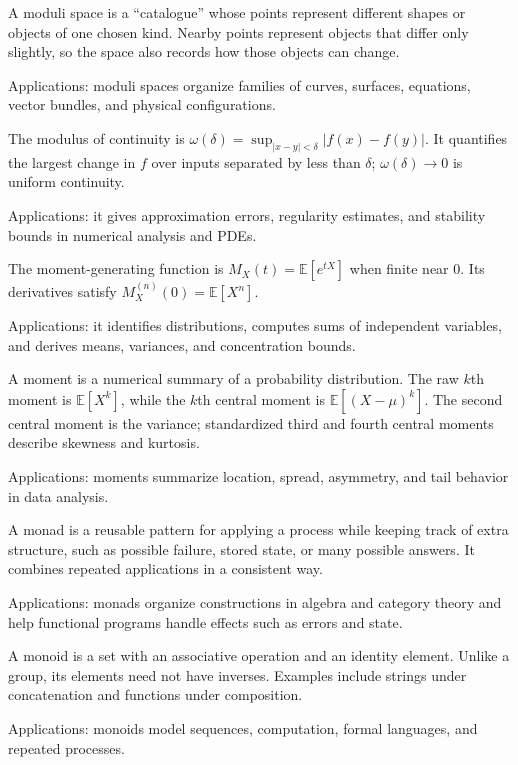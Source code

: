 A moduli space is a “catalogue” whose points represent different shapes or objects of one chosen kind. Nearby points represent objects that differ only slightly, so the space also records how those objects can change. \par\noindent Applications: moduli spaces organize families of curves, surfaces, equations, vector bundles, and physical configurations.

The modulus of continuity is $\omega(\delta)=\sup_{|x-y|<\delta}|f(x)-f(y)|$. It quantifies the largest change in $f$ over inputs separated by less than $\delta$; $\omega(\delta)\to0$ is uniform continuity. \par\noindent Applications: it gives approximation errors, regularity estimates, and stability bounds in numerical analysis and PDEs.

The moment-generating function is $M_X(t)=\mathbb E[e^{tX}]$ when finite near $0$. Its derivatives satisfy $M_X^{(n)}(0)=\mathbb E[X^n]$. \par\noindent Applications: it identifies distributions, computes sums of independent variables, and derives means, variances, and concentration bounds.

A moment is a numerical summary of a probability distribution. The raw $k$th moment is $\mathbb{E}[X^k]$, while the $k$th central moment is $\mathbb{E}[(X-\mu)^k]$. The second central moment is the variance; standardized third and fourth central moments describe skewness and kurtosis. \par\noindent Applications: moments summarize location, spread, asymmetry, and tail behavior in data analysis.

A monad is a reusable pattern for applying a process while keeping track of extra structure, such as possible failure, stored state, or many possible answers. It combines repeated applications in a consistent way. \par\noindent Applications: monads organize constructions in algebra and category theory and help functional programs handle effects such as errors and state.

A monoid is a set with an associative operation and an identity element. Unlike a group, its elements need not have inverses. Examples include strings under concatenation and functions under composition. \par\noindent Applications: monoids model sequences, computation, formal languages, and repeated processes.

